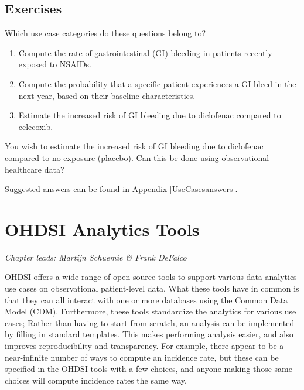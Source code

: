 \documentclass[11pt]{book}
\theoremstyle{definition}
\theoremstyle{definition}
\theoremstyle{definition}
\theoremstyle{remark}
\let\BeginKnitrBlock\begin \let\EndKnitrBlock\end
\begin{document}
\hypertarget{exercises-1}{%
\section{Exercises}\label{exercises-1}}

\BeginKnitrBlock{exercise}
\protect\hypertarget{exr:exerciseUseCases1}{}{\label{exr:exerciseUseCases1} }Which use case categories do these questions belong to?

\begin{enumerate}
\def\labelenumi{\arabic{enumi}.}
\item
  Compute the rate of gastrointestinal (GI) bleeding in patients recently exposed to NSAIDs.
\item
  Compute the probability that a specific patient experiences a GI bleed in the next year, based on their baseline characteristics.
\item
  Estimate the increased risk of GI bleeding due to diclofenac compared to celecoxib.
\end{enumerate}
\EndKnitrBlock{exercise}

\BeginKnitrBlock{exercise}
\protect\hypertarget{exr:exerciseUseCases2}{}{\label{exr:exerciseUseCases2} }You wish to estimate the increased risk of GI bleeding due to diclofenac compared to no exposure (placebo). Can this be done using observational healthcare data?
\EndKnitrBlock{exercise}

Suggested answers can be found in Appendix \ref{UseCasesanswers}.

\hypertarget{OhdsiAnalyticsTools}{%
\chapter{OHDSI Analytics Tools}\label{OhdsiAnalyticsTools}}

\emph{Chapter leads: Martijn Schuemie \& Frank DeFalco}

OHDSI offers a wide range of open source tools to support various data-analytics use cases on observational patient-level data. What these tools have in common is that they can all interact with one or more databases using the Common Data Model (CDM). Furthermore, these tools standardize the analytics for various use cases; Rather than having to start from scratch, an analysis can be implemented by filling in standard templates. This makes performing analysis easier, and also improves reproducibility and transparency. For example, there appear to be a near-infinite number of ways to compute an incidence rate, but these can be specified in the OHDSI tools with a few choices, and anyone making those same choices will compute incidence rates the same way.
\end{document}
